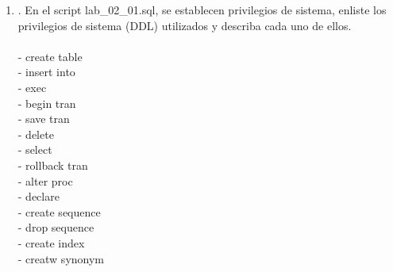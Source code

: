 \begin{enumerate}[1.]
	\\por ejemplo, para el mantenimiento programado de la interrupci\'on.
	\\
	\\- SHUTDOWN ABORT 
	\\Procede con el cierre m\'as r\'apido posible de la base de datos sin esperar a que finalicen las llamadas o que los usuarios se desconecten.
	\\Las transacciones no confirmadas no se revierten. Las sentencias de SQL del cliente que se est\'an procesando est\'an finalizadas. Todos los usuarios actualmente conectados a la base 
	\\de datos est\'an desconectados impl\'icitamente y el pr\'oximo inicio de la base de datos requerir\'a la recuperaci\'on de la instancia.
	\\Debe usar esta opci\'on si un proceso en segundo plano termina anormalmente.
	\\
	\\- SHUTDOWN INMEDIATE
	\\No espera a que finalicen las llamadas actuales o que los usuarios se desconecten de la base de datos.
	\\M\'as conexiones estn prohibidas. La base de datos est\'a cerrada y desmontada. La instancia se apaga y no se requiere recuperaci\'on de instancias en el pr\'oximo inicio de la base de 
	\\datos.


	\item . En el script lab\_02\_01.sql, se establecen privilegios de sistema, enliste los privilegios de sistema (DDL) utilizados y describa cada uno de ellos.
	\\\\- create table 
	\\- insert into
	\\- exec
	\\- begin tran
	\\- save tran
	\\- delete
	\\- select
	\\- rollback tran
	\\- alter proc
	\\- declare
	\\-  create sequence
	\\- drop sequence
	\\- create index
	\\- creatw synonym
	

\end{enumerate}
